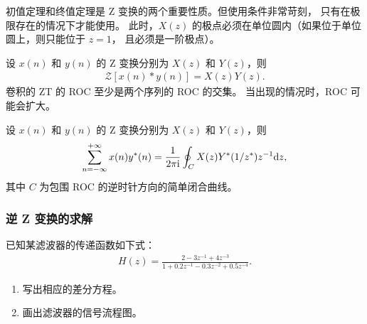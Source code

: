 \begin{remark}
    初值定理和终值定理是 Z 变换的两个重要性质。但使用条件非常苛刻，
    只有在极限存在的情况下才能使用。
    此时，$X(z)$ 的极点必须在单位圆内（如果位于单位圆上，则只能位于 $z = 1$，
    且必须是一阶极点）。
\end{remark}

\begin{property}[ZT 的时域卷积定理]
    设 $x(n)$ 和 $y(n)$ 的 Z 变换分别为 $X(z)$ 和 $Y(z)$，则
    \begin{align*}
        \mathcal{Z}[x(n) * y(n)] = X(z)Y(z).
    \end{align*}
    卷积的 ZT 的 ROC 至少是两个序列的 ROC 的交集。
    当出现的情况时，ROC 可能会扩大。
\end{property}

\begin{property}[ZT 的帕斯瓦尔定理]
    设 $x(n)$ 和 $y(n)$ 的 Z 变换分别为 $X(z)$ 和 $Y(z)$，则
    \begin{align*}
        \sum_{n=-\infty}^{+\infty} x(n)y^*(n) = \frac{1}{2\pi\mathrm{i}}\oint_C X(z)Y^*(1/z^*)z^{-1} \mathrm{d}z,
    \end{align*}
    其中 $C$ 为包围 ROC 的逆时针方向的简单闭合曲线。
\end{property}

\subsubsection{逆 Z 变换的求解}


\begin{exercise}
    已知某滤波器的传递函数如下式：
    \begin{align*}
        H(z) = \frac{2 - 3z^{-1} + 4z^{-3}}{1 + 0.2z^{-1} - 0.3z^{-2} + 0.5z^{-4}}.
    \end{align*}
    \begin{enumerate}[label=(\arabic*)]
        \item 写出相应的差分方程。
        \item 画出滤波器的信号流程图。
    \end{enumerate}
\end{exercise}

